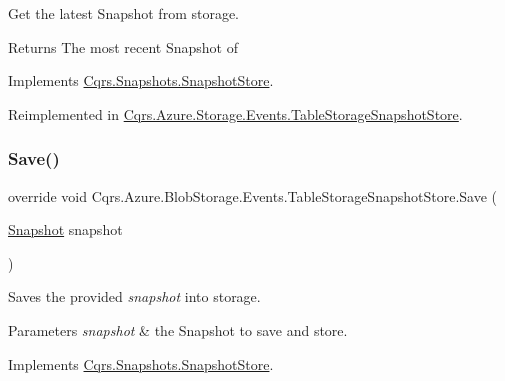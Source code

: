 Get the latest Snapshot from storage. 

\begin{DoxyReturn}{Returns}
The most recent Snapshot of
\end{DoxyReturn}


Implements \hyperlink{classCqrs_1_1Snapshots_1_1SnapshotStore_ab2ecab1a665c0f2097929d028fe4ac69_ab2ecab1a665c0f2097929d028fe4ac69}{Cqrs.\+Snapshots.\+Snapshot\+Store}.



Reimplemented in \hyperlink{classCqrs_1_1Azure_1_1Storage_1_1Events_1_1TableStorageSnapshotStore_ac552ed9e69ca9ce8bbd9f14b4ecb546f_ac552ed9e69ca9ce8bbd9f14b4ecb546f}{Cqrs.\+Azure.\+Storage.\+Events.\+Table\+Storage\+Snapshot\+Store}.

\mbox{\label{classCqrs_1_1Azure_1_1BlobStorage_1_1Events_1_1TableStorageSnapshotStore_a25ec7d179773aec79febdf0e8873b285_a25ec7d179773aec79febdf0e8873b285}} 
\subsubsection{\texorpdfstring{Save()}{Save()}}
{\footnotesize\ttfamily override void Cqrs.\+Azure.\+Blob\+Storage.\+Events.\+Table\+Storage\+Snapshot\+Store.\+Save (\begin{DoxyParamCaption}\item[{\hyperlink{classCqrs_1_1Snapshots_1_1Snapshot}{Snapshot}}]{snapshot }\end{DoxyParamCaption})\hspace{0.3cm}{\ttfamily [virtual]}}



Saves the provided {\itshape snapshot}  into storage. 


\begin{DoxyParams}{Parameters}
{\em snapshot} & the Snapshot to save and store.\\
\hline
\end{DoxyParams}


Implements \hyperlink{classCqrs_1_1Snapshots_1_1SnapshotStore_ae96ea2bb89a0bd7f45544acc37107525_ae96ea2bb89a0bd7f45544acc37107525}{Cqrs.\+Snapshots.\+Snapshot\+Store}.




